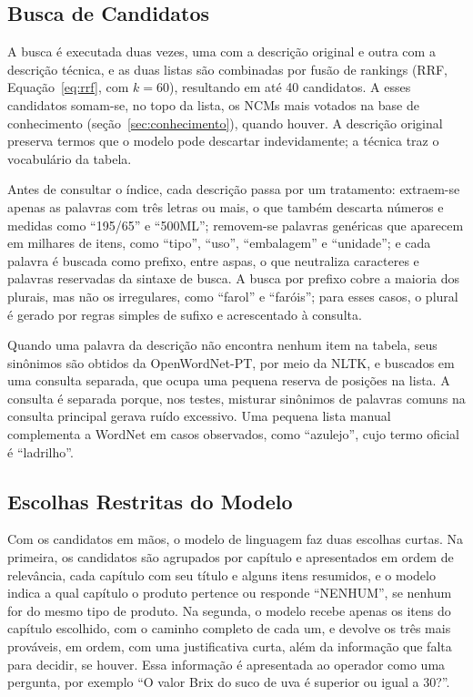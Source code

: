 \subsection{Busca de Candidatos}

A busca é executada duas vezes, uma com a descrição original e outra com a descrição técnica, e as duas listas são combinadas por fusão de rankings (RRF, Equação~\ref{eq:rrf}, com $k = 60$), resultando em até 40 candidatos. A esses candidatos somam-se, no topo da lista, os NCMs mais votados na base de conhecimento (seção~\ref{sec:conhecimento}), quando houver. A descrição original preserva termos que o modelo pode descartar indevidamente; a técnica traz o vocabulário da tabela.

Antes de consultar o índice, cada descrição passa por um tratamento: extraem-se apenas as palavras com três letras ou mais, o que também descarta números e medidas como ``195/65'' e ``500ML''; removem-se palavras genéricas que aparecem em milhares de itens, como ``tipo'', ``uso'', ``embalagem'' e ``unidade''; e cada palavra é buscada como prefixo, entre aspas, o que neutraliza caracteres e palavras reservadas da sintaxe de busca. A busca por prefixo cobre a maioria dos plurais, mas não os irregulares, como ``farol'' e ``faróis''; para esses casos, o plural é gerado por regras simples de sufixo e acrescentado à consulta.

Quando uma palavra da descrição não encontra nenhum item na tabela, seus sinônimos são obtidos da OpenWordNet-PT, por meio da NLTK, e buscados em uma consulta separada, que ocupa uma pequena reserva de posições na lista. A consulta é separada porque, nos testes, misturar sinônimos de palavras comuns na consulta principal gerava ruído excessivo. Uma pequena lista manual complementa a WordNet em casos observados, como ``azulejo'', cujo termo oficial é ``ladrilho''.

\subsection{Escolhas Restritas do Modelo}

Com os candidatos em mãos, o modelo de linguagem faz duas escolhas curtas. Na primeira, os candidatos são agrupados por capítulo e apresentados em ordem de relevância, cada capítulo com seu título e alguns itens resumidos, e o modelo indica a qual capítulo o produto pertence ou responde ``NENHUM'', se nenhum for do mesmo tipo de produto. Na segunda, o modelo recebe apenas os itens do capítulo escolhido, com o caminho completo de cada um, e devolve os três mais prováveis, em ordem, com uma justificativa curta, além da informação que falta para decidir, se houver. Essa informação é apresentada ao operador como uma pergunta, por exemplo ``O valor Brix do suco de uva é superior ou igual a 30?''.

